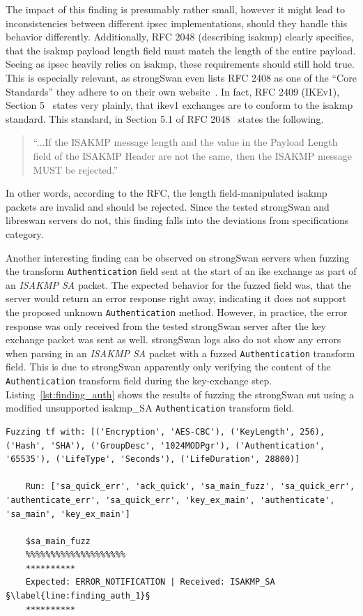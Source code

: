 The impact of this finding is presumably rather small, however it might lead to inconsistencies between different \ac{ipsec} implementations, should they handle this behavior differently. Additionally, RFC 2048 (describing \ac{isakmp}) clearly specifies, that the \ac{isakmp} payload length field must match the length of the entire payload. Seeing as \ac{ipsec} heavily relies on \ac{isakmp}, these requirements should still hold true. This is especially relevant, as strongSwan even lists RFC 2408 as one of the ``Core Standards'' they adhere to on their own website~\cite{strongswan-ietf}. In fact, RFC 2409 (IKEv1), Section 5~\cite{rfc:ikev1} states very plainly, that \ac{ike}v1 exchanges are to conform to the \ac{isakmp} standard.
This standard, in Section 5.1 of RFC 2048~\cite{rfc:isakmp} states the following. 

\begin{quotation}
	``...If the ISAKMP message length and the value in
	the Payload Length field of the ISAKMP Header are not the same, then
	the ISAKMP message MUST be rejected.''
\end{quotation}

In other words, according to the RFC, the length field-manipulated \ac{isakmp} packets are invalid and should be rejected. Since the tested strongSwan and libreswan servers do not, this finding falls into the deviations from specifications category. 

Another interesting finding can be observed on strongSwan servers when fuzzing the transform \texttt{Authentication} field sent at the start of an \ac{ike} exchange as part of an \emph{ISAKMP SA} packet. The expected behavior for the fuzzed field was, that the server would return an error response right away, indicating it does not support the proposed unknown \texttt{Authentication} method. However, in practice, the error response was only received from the tested strongSwan server after the key exchange packet was sent as well. strongSwan logs also do not show any errors when parsing in an \emph{ISAKMP SA} packet with a fuzzed \texttt{Authentication} transform field. This is due to strongSwan apparently only verifying the content of the \texttt{Authentication} transform field during the key-exchange step. Listing~\ref{lst:finding_auth} shows the results of fuzzing the strongSwan \ac{sut} using a modified unsupported \ac{isakmp}\_SA \texttt{Authentication} transform field. 

\begin{lstlisting}[float=h, caption=Discovered finding showing the Authentication field not being validated., label=lst:finding_auth, escapechar=§]
	Fuzzing tf with: [('Encryption', 'AES-CBC'), ('KeyLength', 256), ('Hash', 'SHA'), ('GroupDesc', '1024MODPgr'), ('Authentication', '65535'), ('LifeType', 'Seconds'), ('LifeDuration', 28800)]
	
	Run: ['sa_quick_err', 'ack_quick', 'sa_main_fuzz', 'sa_quick_err', 'authenticate_err', 'sa_quick_err', 'key_ex_main', 'authenticate', 'sa_main', 'key_ex_main']
	
	$sa_main_fuzz
	%%%%%%%%%%%%%%%%%%%%
	**********
	Expected: ERROR_NOTIFICATION | Received: ISAKMP_SA §\label{line:finding_auth_1}§
	**********
\end{lstlisting}

